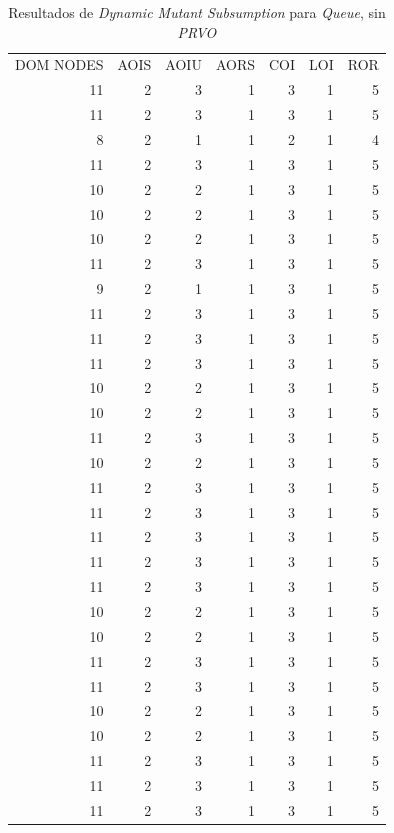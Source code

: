 \begin{table}[]
	\caption[\emph{Dynamic Mutant Subsumption} \emph{Queue}, sin \emph{PRVO}]{Resultados de \emph{Dynamic Mutant Subsumption} para \emph{Queue}, sin \emph{PRVO}}
	\label{tables.results.subsumption.queue.noprvo}
	\centering
	\scriptsize
	\def\arraystretch{0.95}
	\setlength\tabcolsep{0.5mm}
	\begin{tabular}{rrrrrrr}
		DOM NODES & AOIS & AOIU & AORS & COI & LOI & ROR \\
		11 & 2 & 3 & 1 & 3 & 1 & 5 \\
		11 & 2 & 3 & 1 & 3 & 1 & 5 \\
		8 & 2 & 1 & 1 & 2 & 1 & 4 \\
		11 & 2 & 3 & 1 & 3 & 1 & 5 \\
		10 & 2 & 2 & 1 & 3 & 1 & 5 \\
		10 & 2 & 2 & 1 & 3 & 1 & 5 \\
		10 & 2 & 2 & 1 & 3 & 1 & 5 \\
		11 & 2 & 3 & 1 & 3 & 1 & 5 \\
		9 & 2 & 1 & 1 & 3 & 1 & 5 \\
		11 & 2 & 3 & 1 & 3 & 1 & 5 \\
		11 & 2 & 3 & 1 & 3 & 1 & 5 \\
		11 & 2 & 3 & 1 & 3 & 1 & 5 \\
		10 & 2 & 2 & 1 & 3 & 1 & 5 \\
		10 & 2 & 2 & 1 & 3 & 1 & 5 \\
		11 & 2 & 3 & 1 & 3 & 1 & 5 \\
		10 & 2 & 2 & 1 & 3 & 1 & 5 \\
		11 & 2 & 3 & 1 & 3 & 1 & 5 \\
		11 & 2 & 3 & 1 & 3 & 1 & 5 \\
		11 & 2 & 3 & 1 & 3 & 1 & 5 \\
		11 & 2 & 3 & 1 & 3 & 1 & 5 \\
		11 & 2 & 3 & 1 & 3 & 1 & 5 \\
		10 & 2 & 2 & 1 & 3 & 1 & 5 \\
		10 & 2 & 2 & 1 & 3 & 1 & 5 \\
		11 & 2 & 3 & 1 & 3 & 1 & 5 \\
		11 & 2 & 3 & 1 & 3 & 1 & 5 \\
		10 & 2 & 2 & 1 & 3 & 1 & 5 \\
		10 & 2 & 2 & 1 & 3 & 1 & 5 \\
		11 & 2 & 3 & 1 & 3 & 1 & 5 \\
		11 & 2 & 3 & 1 & 3 & 1 & 5 \\
		11 & 2 & 3 & 1 & 3 & 1 & 5
	\end{tabular}
\end{table}

